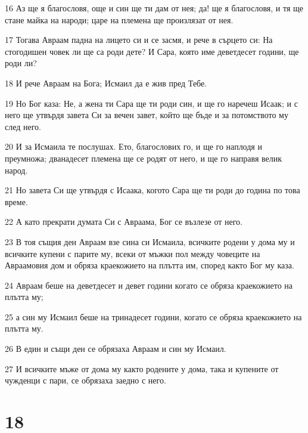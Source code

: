 \par 16 Аз ще я благословя, още и син ще ти дам от нея; да! ще я благословя, и тя ще стане майка на народи; царе на племена ще произлязат от нея.
\par 17 Тогава Авраам падна на лицето си и се засмя, и рече в сърцето си: На стогодишен човек ли ще са роди дете? И Сара, която име деветдесет години, ще роди ли?
\par 18 И рече Авраам на Бога; Исмаил да е жив пред Тебе.
\par 19 Но Бог каза: Не, а жена ти Сара ще ти роди син, и ще го наречеш Исаак; и с него ще утвърдя завета Си за вечен завет, който ще бъде и за потомството му след него.
\par 20 И за Исмаила те послушах. Ето, благослових го, и ще го наплодя и преумножа; дванадесет племена ще се родят от него, и ще го направя велик народ.
\par 21 Но завета Си ще утвърдя с Исаака, когото Сара ще ти роди до година по това време.
\par 22 А като прекрати думата Си с Авраама, Бог се възлезе от него.
\par 23 В тоя същия ден Авраам взе сина си Исмаила, всичките родени у дома му и всичките купени с парите му, всеки от мъжки пол между човеците на Авраамовия дом и обряза краекожието на плътта им, според както Бог му каза.
\par 24 Авраам беше на деветдесет и девет години когато се обряза краекожието на плътта му;
\par 25 а син му Исмаил беше на тринадесет години, когато се обряза краекожието на плътта му.
\par 26 В един и същи ден се обрязаха Авраам и син му Исмаил.
\par 27 И всичките мъже от дома му както родените у дома, така и купените от чужденци с пари, се обрязаха заедно с него.

\chapter{18}

